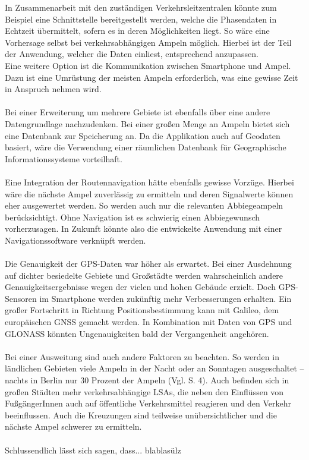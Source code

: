 In Zusammenarbeit mit den zuständigen Verkehrsleitzentralen könnte zum Beispiel eine Schnittstelle bereitgestellt werden, welche die Phasendaten in Echtzeit übermittelt, sofern es in deren Möglichkeiten liegt. So wäre eine Vorhersage selbst bei verkehrsabhängigen Ampeln möglich. Hierbei ist der Teil der Anwendung, welcher die Daten einliest, entsprechend anzupassen.\\
Eine weitere Option ist die Kommunikation zwischen \gls{Smartphone} und Ampel. Dazu ist eine Umrüstung der meisten Ampeln erforderlich, was eine gewisse Zeit in Anspruch nehmen wird. \cite{smart_lsa}\\\\
Bei einer Erweiterung um mehrere Gebiete ist ebenfalls über eine andere Datengrundlage nachzudenken. Bei einer großen Menge an Ampeln bietet sich eine Datenbank zur Speicherung an. Da die Applikation auch auf Geodaten basiert, wäre die Verwendung einer räumlichen Datenbank für Geographische Informationssysteme vorteilhaft. \\\\
Eine Integration der Routennavigation hätte ebenfalls gewisse Vorzüge. Hierbei wäre die nächste Ampel zuverlässig zu ermitteln und deren Signalwerte können eher ausgewertet werden. So werden auch nur die relevanten Abbiegeampeln berücksichtigt. Ohne Navigation ist es schwierig einen Abbiegewunsch vorherzusagen. In Zukunft könnte also die entwickelte Anwendung mit einer Navigationssoftware verknüpft werden.\\\\
Die Genauigkeit der \gls{GPS}-Daten war höher als erwartet. Bei einer Ausdehnung auf dichter besiedelte Gebiete und Großstädte werden wahrscheinlich andere Genauigkeitsergebnisse wegen der vielen und hohen Gebäude erzielt. Doch \gls{GPS}-Sensoren im \gls{Smartphone} werden zukünftig mehr Verbesserungen erhalten. 
Ein großer Fortschritt in Richtung Positionsbestimmung kann mit Galileo, dem europäischen \gls{GNSS} gemacht werden. In Kombination mit Daten von \gls{GPS} und \gls{GLONASS} könnten Ungenauigkeiten bald der Vergangenheit angehören. \cite{gnss}\\\\
Bei einer Ausweitung sind auch andere Faktoren zu beachten. So werden in ländlichen Gebieten viele Ampeln in der Nacht oder an Sonntagen ausgeschaltet -- nachts in Berlin nur 30 Prozent der Ampeln (Vgl. \cite{lsa_bln} S. 4). Auch befinden sich in großen Städten mehr verkehrsabhängige \glspl{LSA}, die neben den Einflüssen von FußgängerInnen auch auf öffentliche Verkehrsmittel reagieren und den Verkehr beeinflussen. Auch die Kreuzungen sind teilweise unübersichtlicher und die nächste Ampel schwerer zu ermitteln.\\\\
Schlussendlich lässt sich sagen, dass... blablasülz
